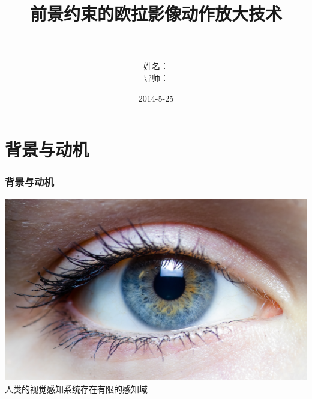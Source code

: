 \documentclass[xcolor=svgnames,serif,table,10pt]{beamer}
\title{前景约束的欧拉影像动作放大技术}
\author[潘伟洲]{\\~\\姓名：\makebox[4em][s]{潘伟洲~\hspace{2em}}\\
  导师：\makebox[4em][s]{李兴民~教授}\\
}
\date{2014-5-25}
\begin{document}
\setlength{\abovedisplayskip}{1ex}%
\setlength{\belowdisplayskip}{1ex}%

\begin{frame}
  \titlepage
\end{frame}

\begin{frame}[plain]
  \Large
  \tableofcontents
\end{frame}


\section{背景与动机}
\label{sec:Why}

\begin{frame}
  \frametitle{背景与动机}
  \begin{center}
    \includegraphics[width=.5\textwidth]{eye.jpg}\\
    \Large 人类的视觉感知系统存在有限的感知域
  \end{center}
\end{frame}
\end{document}
